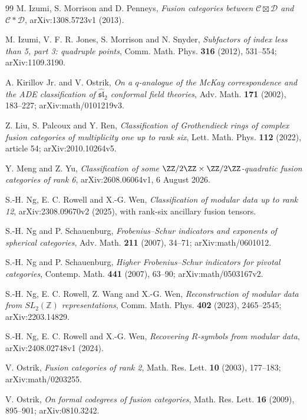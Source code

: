 \begin{thebibliography}{99}
M. Izumi, S. Morrison and D. Penneys, \emph{Fusion categories between $\mathcal C\boxtimes\mathcal D$ and $\mathcal C*\mathcal D$}, arXiv:1308.5723v1 (2013).

M. Izumi, V. F. R. Jones, S. Morrison and N. Snyder, \emph{Subfactors of index less than 5, part 3: quadruple points}, Comm. Math. Phys. \textbf{316} (2012), 531--554; arXiv:1109.3190.

A. Kirillov Jr. and V. Ostrik, \emph{On a $q$-analogue of the McKay correspondence and the ADE classification of $\widehat{\mathfrak{sl}}_2$ conformal field theories}, Adv. Math. \textbf{171} (2002), 183--227; arXiv:math/0101219v3.

Z. Liu, S. Palcoux and Y. Ren, \emph{Classification of Grothendieck rings of complex fusion categories of multiplicity one up to rank six}, Lett. Math. Phys. \textbf{112} (2022), article 54; arXiv:2010.10264v5.

Y. Meng and Z. Yu, \emph{Classification of some $\ZZ/2\ZZ\times\ZZ/2\ZZ$-quadratic fusion categories of rank 6}, arXiv:2608.06064v1, 6 August 2026.

S.-H. Ng, E. C. Rowell and X.-G. Wen, \emph{Classification of modular data up to rank 12}, arXiv:2308.09670v2 (2025), with rank-six ancillary fusion tensors.

S.-H. Ng and P. Schauenburg, \emph{Frobenius--Schur indicators and exponents of spherical categories}, Adv. Math. \textbf{211} (2007), 34--71; arXiv:math/0601012.

S.-H. Ng and P. Schauenburg, \emph{Higher Frobenius--Schur indicators for pivotal categories}, Contemp. Math. \textbf{441} (2007), 63--90; arXiv:math/0503167v2.

S.-H. Ng, E. C. Rowell, Z. Wang and X.-G. Wen, \emph{Reconstruction of modular data from $SL_2(\mathbb Z)$ representations}, Comm. Math. Phys. \textbf{402} (2023), 2465--2545; arXiv:2203.14829.

S.-H. Ng, E. C. Rowell and X.-G. Wen, \emph{Recovering $R$-symbols from modular data}, arXiv:2408.02748v1 (2024).

V. Ostrik, \emph{Fusion categories of rank 2}, Math. Res. Lett. \textbf{10} (2003), 177--183; arXiv:math/0203255.

V. Ostrik, \emph{On formal codegrees of fusion categories}, Math. Res. Lett. \textbf{16} (2009), 895--901; arXiv:0810.3242.


\end{thebibliography}
